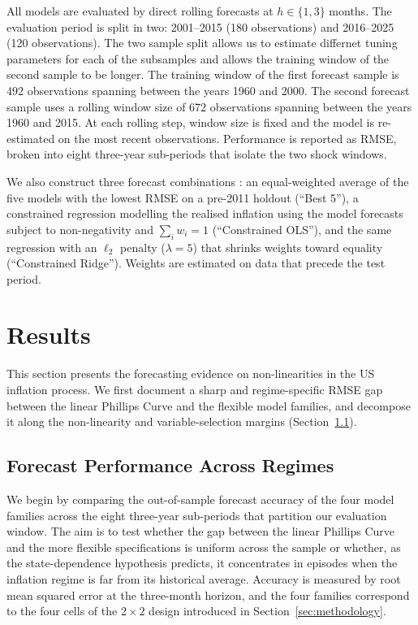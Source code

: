 \documentclass[12pt,a4paper]{article}
\begin{document}
All models are evaluated by direct rolling forecasts at $h \in \{1, 3\}$ months. The evaluation period is split in two: 2001--2015 (180 observations) and 2016--2025 (120 observations). The two sample split allows us to estimate differnet tuning parameters for each of the subsamples and allows the training window of the second sample to be longer. The training window of the first forecast sample is 492 observations spanning between the years 1960 and 2000. The second forecast sample uses a rolling window size of 672 observations spanning between the years 1960 and 2015. At each rolling step, window size is fixed and the model is re-estimated on the most recent observations. Performance is reported as RMSE, broken into eight three-year sub-periods that isolate the two shock windows.

We also construct three forecast combinations \citep{batesgranger1969,timmermann2006}: an equal-weighted average of the five models with the lowest RMSE on a pre-2011 holdout (``Best 5''), a constrained regression modelling the realised inflation using the model forecasts subject to non-negativity and $\sum_i w_i = 1$ (``Constrained OLS''), and the same regression with an $\ell_2$ penalty ($\lambda=5$) that shrinks weights toward equality (``Constrained Ridge''). Weights are estimated on data that precede the test period.

\FloatBarrier
\section{Results}
\label{sec:results}

This section presents the forecasting evidence on non-linearities in the US inflation process. We first document a sharp and regime-specific RMSE gap between the linear Phillips Curve and the flexible model families, and decompose it along the non-linearity and variable-selection margins (Section~\ref{subsec:main_results}).

\subsection{Forecast Performance Across Regimes}
\label{subsec:main_results}

We begin by comparing the out-of-sample forecast accuracy of the four model families across the eight three-year sub-periods that partition our evaluation window. The aim is to test whether the gap between the linear Phillips Curve and the more flexible specifications is uniform across the sample or whether, as the state-dependence hypothesis predicts, it concentrates in episodes when the inflation regime is far from its historical average. Accuracy is measured by root mean squared error at the three-month horizon, and the four families correspond to the four cells of the $2\times 2$ design introduced in Section~\ref{sec:methodology}.
\end{document}
